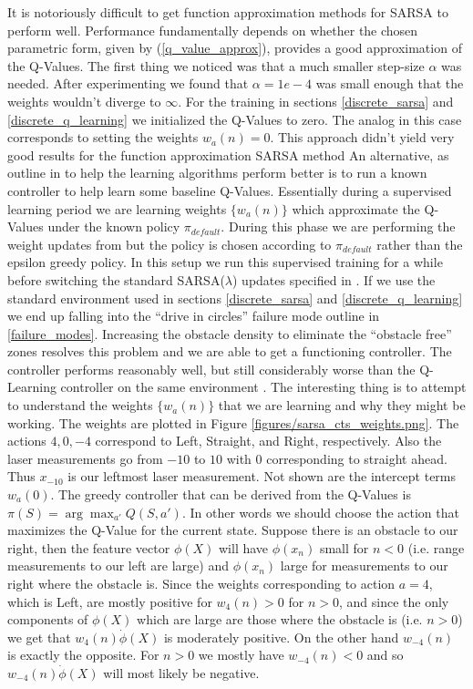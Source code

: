\documentclass{article}
\begin{document}
It is notoriously difficult to get function approximation methods for SARSA to perform well. Performance fundamentally depends on whether the chosen parametric form, given by (\ref{q_value_approx}), provides a good approximation of the Q-Values. The first thing we noticed was that a much smaller step-size $\alpha$ was needed. After experimenting we found that $\alpha = 1e-4$ was small enough that the weights wouldn't diverge to $\infty$. For the training in sections \ref{discrete_sarsa} and \ref{discrete_q_learning} we initialized the Q-Values to zero. The analog in this case corresponds to setting the weights $w_a(n) = 0$. This approach didn't yield very good results for the function approximation SARSA method  An alternative, as outline in  to help the learning algorithms perform better is to run a known controller to help learn some baseline Q-Values. Essentially during a supervised learning period we are learning weights $\{w_a(n)\}$ which approximate the Q-Values under the known policy $\pi_{default}$. During this phase we are performing the weight updates from  but the policy is chosen according to $\pi_{default}$ rather than the epsilon greedy policy. In this setup we run this supervised training for a while before switching the standard SARSA($\lambda$) updates specified in . If we use the standard environment used in sections \ref{discrete_sarsa} and \ref{discrete_q_learning} we end up falling into the ``drive in circles'' failure mode outline in \ref{failure_modes}. Increasing the obstacle density to eliminate the ``obstacle free'' zones resolves this problem and we are able to get a functioning controller. The controller performs reasonably well, but still considerably worse than the Q-Learning controller on the same environment . The interesting thing is to attempt to understand the weights $\{w_a(n)\}$ that we are learning and why they might be working. The weights are plotted in Figure \ref{figures/sarsa_cts_weights.png}. The actions ${4,0,-4}$ correspond to Left, Straight, and Right, respectively. Also the laser measurements go from $-10$ to $10$ with $0$ corresponding to straight ahead. Thus $x_{-10}$ is our leftmost laser measurement. Not shown are the intercept terms $w_a(0)$. The greedy controller that can be derived from the Q-Values is $\pi(S) = \arg \max_{a'} Q(S,a')$. In other words we should choose the action that maximizes the Q-Value for the current state. Suppose there is an obstacle to our right, then the feature vector $\phi(X)$ will have $\phi(x_n)$ small for $n < 0$ (i.e. range measurements to our left are large) and $\phi(x_n)$ large for measurements to our right where the obstacle is. Since the weights corresponding to action $a = 4$, which is Left, are mostly positive for $w_4(n) > 0$ for $n > 0$, and since the only components of $\phi(X)$ which are large are those where the obstacle is (i.e. $n > 0$) we get that $w_{4}(n) \dot \phi(X)$ is moderately positive. On the other hand $w_{-4}(n)$ is exactly the opposite. For $n > 0$ we mostly have $w_{-4}(n) < 0$ and so $w_{-4}(n) \dot \phi(X)$ will most likely be negative. 
\end{document}
